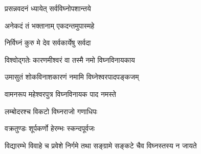 
{प्रसन्नवदनं ध्यायेत् सर्वविघ्नोपशान्तये}

{अनेकदं तं भक्तानाम् एकदन्तमुपास्महे}

{निर्विघ्नं कुरु मे देव सर्वकार्येषु सर्वदा}

{विश्वोद्गतेः कारणमीश्वरं वा तस्मै नमो विघ्नविनायकाय}

{उमासुतं शोकविनाशकारणं नमामि विघ्नेश्वरपादपङ्कजम्}

{वामनरूप महेश्वरपुत्र विघ्नविनायक पाद नमस्ते}

{लम्बोदरश्च विकटो विघ्नराजो गणाधिपः}

{वक्रतुण्डः शूर्पकर्णो हेरम्भः स्कन्दपूर्वजः}

{विद्यारम्भे विवाहे च प्रवेशे निर्गमे तथा}
{सङ्ग्रामे सङ्कटे चैव विघ्नस्तस्य न जायते}